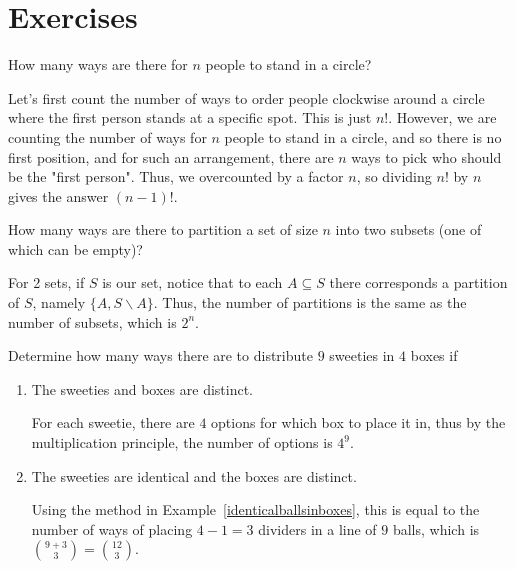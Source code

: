 \documentclass[11pt,dvipsnames]{book}
\numberwithin{figure}{section} %
\numberwithin{table}{section} %
\begin{document}
\section{Exercises}
\begin{exercise}
 How many ways are there for $n$ people to stand in a circle?

 \begin{solution}
 Let's first count the number of ways to order people clockwise around a circle where the first person stands at a specific spot. This is just $n!$. However, we are counting the number of ways for $n$ people to stand in a circle, and so there is no first position, and for such an arrangement, there are $n$ ways to pick who should be the "first person". Thus, we overcounted by a factor $n$, so dividing $n!$ by $n$ gives the answer $(n-1)!$.
 \end{solution}
 \end{exercise}

\begin{exercise}
How many ways are there to partition a set of size $n$ into two subsets (one of which can be empty)?
\begin{solution}
For 2 sets, if $S$ is our set, notice that to each $A\subseteq S$ there corresponds a partition of $S$, namely $\{A,S\backslash A\}$. Thus, the number of partitions is the same as the number of subsets, which is $2^{n}$.
\end{solution}
\end{exercise}

\begin{exercise}
Determine how many ways there are to distribute $9$ sweeties in $4$ boxes if
\begin{enumerate}[label=(\alph*)]
\item The sweeties and boxes are distinct.
\begin{solution}
For each sweetie, there are $4$ options for which box to place it in, thus by the multiplication principle, the number of options is $4^{9}$.
\end{solution}
\item The sweeties are identical and the boxes are distinct.
\begin{solution}
Using the method in Example~\ref{identicalballsinboxes}, this is equal to the number of ways of placing $4-1 = 3$ dividers in a line of $9$ balls, which is ${{9+3}\choose {3}} = {12 \choose 3}$.
\end{solution}
\end{enumerate}
\end{exercise}
\end{document}
